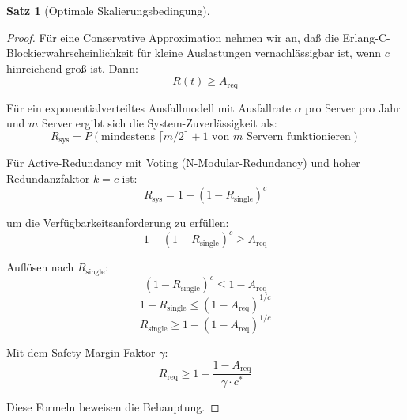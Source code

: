 \documentclass[a4paper,11pt]{article}
\theoremstyle{definition}
\newtheorem{satz}{Satz}
\newenvironment{beweis}{\begin{proof}}{\end{proof}}
\begin{document}
\begin{satz}[Optimale Skalierungsbedingung]
\begin{beweis}
        Für eine Conservative Approximation nehmen wir an, daß die Erlang-C-Blockierwahrscheinlichkeit 
        für kleine Auslastungen vernachlässigbar ist, wenn $c$ hinreichend groß ist. Dann:
        \[
            R(t) \geq A_{\text{req}}
        \]

        Für ein exponentialverteiltes Ausfallmodell mit Ausfallrate $\alpha$ pro Server pro Jahr 
        und $m$ Server ergibt sich die System-Zuverlässigkeit als:
        \[
            R_{\text{sys}} = P(\text{mindestens } \lceil m/2 \rceil + 1 \text{ von } m \text{ Servern funktionieren})
        \]

        Für Active-Redundancy mit Voting (N-Modular-Redundancy) und hoher Redundanzfaktor $k = c$ ist:
        \[
            R_{\text{sys}} = 1 - (1 - R_{\text{single}})^c
        \]

        um die Verfügbarkeitsanforderung zu erfüllen:
        \[
            1 - (1 - R_{\text{single}})^c \geq A_{\text{req}}
        \]

        Auflösen nach $R_{\text{single}}$:
        \[
            (1 - R_{\text{single}})^c \leq 1 - A_{\text{req}}
        \]
        \[
            1 - R_{\text{single}} \leq (1 - A_{\text{req}})^{1/c}
        \]
        \[
            R_{\text{single}} \geq 1 - (1 - A_{\text{req}})^{1/c}
        \]

        Mit dem Safety-Margin-Faktor $\gamma$:
        \[
            R_{\text{req}} \geq 1 - \frac{1 - A_{\text{req}}}{\gamma \cdot c^*}
        \]

        Diese Formeln beweisen die Behauptung.
    \end{beweis}
\end{satz}
\end{document}
